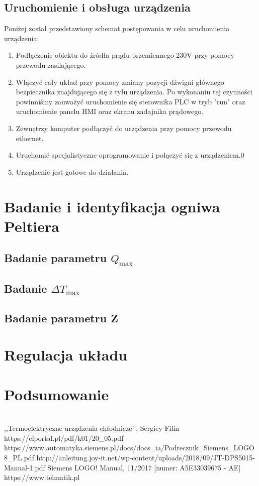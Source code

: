 \documentclass[oneside]{mgr}
\begin{document}
\section{Uruchomienie i obsługa urządzenia}
Poniżej został przedstawiony schemat postępowania w celu uruchomienia urządzenia:
\begin{enumerate}
    \item Podłączenie obiektu do źródła prądu przemiennego 230V przy pomocy przewodu zasilającego.
    \item Włączyć cały układ przy pomocy zmiany pozycji dźwigni głównego bezpiecznika  znajdującego się z tyłu urządzenia. Po wykonaniu tej czynności powinniśmy zauważyć uruchomienie się sterownika PLC w tryb "run" oraz uruchomienie panelu HMI oraz ekranu zadajnika prądowego.
    \item Zewnętrzy komputer podłączyć do urządzenia przy pomocy przewodu ethernet.
    \item Uruchomić specjalistyczne oprogramowanie i połączyć się z urządzeniem.0
    \item Urządzenie jest gotowe do działania.
\end{enumerate}

\chapter{Badanie i identyfikacja ogniwa Peltiera}
\section{Badanie parametru $Q_{\max}$}
\section{Badanie $\Delta T_{\max}$}
\section{Badanie parametru Z}
\chapter{Regulacja układu}
\chapter{Podsumowanie}



\begin{thebibliography} 
\\
,,Termoelektryczne urządzenia chłodnicze’’, Sergiey Filin
https://elportal.pl/pdf/k01/20\_05.pdf
https://www.automatyka.siemens.pl/docs/docs\_ia/Podrecznik\_Siemens\_LOGO8\_PL.pdf
http://anleitung.joy-it.net/wp-content/uploads/2018/09/JT-DPS5015-Manual-1.pdf
Siemens LOGO! Manual, 11/2017 [numer: A5E33039675 - AE]
https://www.telmatik.pl
\end{thebibliography}

\listoffigures
\listoftables
\end{document}
